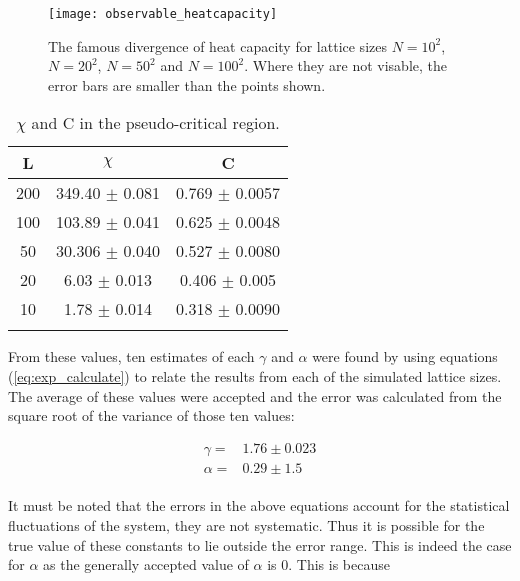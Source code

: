 \documentclass[12pt] {report} %
\begin{document}
			\begin{figure}[H]
				\centering
				\texttt{[image: observable\_heatcapacity]}
				\caption{The famous divergence of heat capacity for lattice sizes $N = 10^2$, $N = 20^2$, $N = 50^2$ and $N = 100^2$. Where they are not visable, the error bars are smaller than the points shown.}
				\label{fig:observable_heatcapacity}
			\end{figure}
			
			\begin{table}[ht]
				\caption{$\chi$ and C in the pseudo-critical region.} %
				\centering %
				\begin{tabular}{c c c} %
					\hline\hline %
					L & $\chi$ & C  \\ [0.5ex] %
					\hline %
					200 & 349.40 $\pm$ 0.081 & 0.769 $\pm$ 0.0057 \\
					100 & 103.89 $\pm$ 0.041 & 0.625 $\pm$ 0.0048 \\ %
					50 & 30.306 $\pm$ 0.040 & 0.527 $\pm$ 0.0080 \\
					20 & 6.03 $\pm$ 0.013 & 0.406 $\pm$ 0.005 \\
					10 & 1.78 $\pm$ 0.014 & 0.318 $\pm$ 0.0090 \\ [1ex] %
					\hline %
					\label{table:chi_and_C}
				\end{tabular}
			\end{table}	
			
			From these values, ten estimates of each $\gamma$ and $\alpha$ were found by using equations (\ref{eq:exp_calculate}) to relate the results from each of the simulated lattice sizes. The average of these values were accepted and the error was calculated from the square root of the variance of those ten values:
			
			\begin{align}
				\gamma =& 1.76 \pm 0.023	\label{eq:value_gamma} \\
				\alpha =& 0.29 \pm 1.5	\label{eq:value_alpha}
			\end{align}
			
			\paragraph{}
				It must be noted that the errors in the above equations account for the statistical fluctuations of the system, they are not systematic. Thus it is possible for the true value of these constants to lie outside the error range. This is indeed the case for $\alpha$ as the generally accepted value of $\alpha$ is 0. This is because 
			
\end{document}

